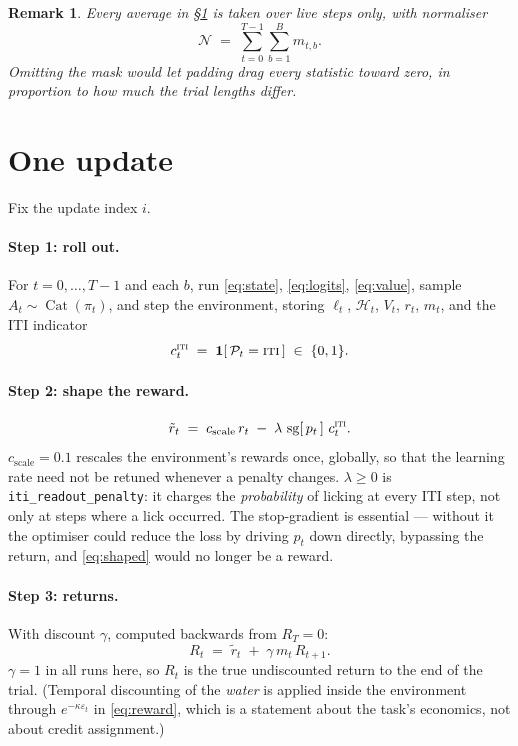 \documentclass[11pt]{article}
\newtheorem{remark}{Remark}
\newcommand{\sg}{\operatorname{sg}}
\newcommand{\1}{\mathbf{1}}
\DeclareMathOperator{\Cat}{Cat}
\begin{document}
\begin{remark}
Every average in \S\ref{sec:update} is taken over live steps only, with normaliser
\begin{equation}
  \mathcal{N} \;=\; \sum_{t=0}^{T-1}\sum_{b=1}^{B} m_{t,b}.
\end{equation}
Omitting the mask would let padding drag every statistic toward zero, in proportion to how
much the trial lengths differ.
\end{remark}

\section{One update}\label{sec:update}

Fix the update index $i$.

\paragraph{Step 1: roll out.} For $t = 0,\dots,T-1$ and each $b$, run \eqref{eq:state},
\eqref{eq:logits}, \eqref{eq:value}, sample $A_t \sim \Cat(\pi_t)$, and step the environment,
storing $\ell_t$, $\mathcal{H}_t$, $V_t$, $r_t$, $m_t$, and the ITI indicator
\begin{equation}
  c^{\textsc{iti}}_t \;=\; \1[\,\mathcal{P}_t = \textsc{iti}\,] \;\in\;\{0,1\}.
\end{equation}

\paragraph{Step 2: shape the reward.}
\begin{equation}
  \tilde r_t \;=\; c_{\mathrm{scale}}\, r_t \;-\; \lambda\, \sg\!\left[\,p_t\,\right] \, c^{\textsc{iti}}_t .
  \label{eq:shaped}
\end{equation}
$c_{\mathrm{scale}} = 0.1$ rescales the environment's rewards once, globally, so that the
learning rate need not be retuned whenever a penalty changes. $\lambda \ge 0$ is
\texttt{iti\_readout\_penalty}: it charges the \emph{probability} of licking at every ITI step,
not only at steps where a lick occurred. The stop-gradient is essential --- without it the
optimiser could reduce the loss by driving $p_t$ down directly, bypassing the return, and
\eqref{eq:shaped} would no longer be a reward.

\paragraph{Step 3: returns.} With discount $\gamma$, computed backwards from $R_T = 0$:
\begin{equation}
  R_t \;=\; \tilde r_t \;+\; \gamma\, m_t\, R_{t+1}.
  \label{eq:return}
\end{equation}
$\gamma = 1$ in all runs here, so $R_t$ is the true undiscounted return to the end of the
trial. (Temporal discounting of the \emph{water} is applied inside the environment through
$e^{-\kappa\varepsilon_t}$ in \eqref{eq:reward}, which is a statement about the task's
economics, not about credit assignment.)
\end{document}
